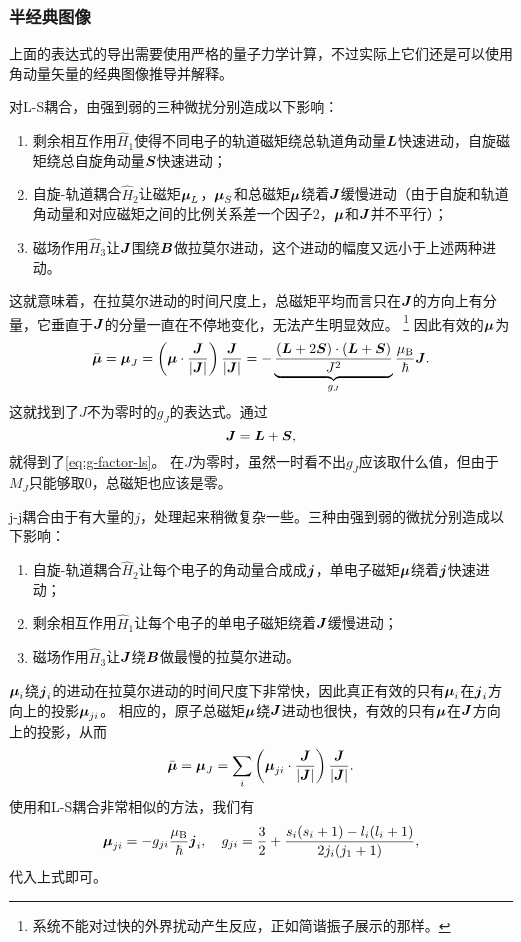 \subsubsection{半经典图像}

上面的表达式的导出需要使用严格的量子力学计算，不过实际上它们还是可以使用角动量矢量的经典图像推导并解释。

对L-S耦合，由强到弱的三种微扰分别造成以下影响：

\begin{enumerate}
    \item 剩余相互作用$\hat{H}_1$使得不同电子的轨道磁矩绕总轨道角动量$\vb*{L}$快速进动，自旋磁矩绕总自旋角动量$\vb*{S}$快速进动；
    \item 自旋-轨道耦合$\hat{H}_2$让磁矩$\vb*{\mu}_L$，$\vb*{\mu}_S$和总磁矩$\vb*{\mu}$绕着$\vb*{J}$缓慢进动（由于自旋和轨道角动量和对应磁矩之间的比例关系差一个因子2，$\vb*{\mu}$和$\vb*{J}$并不平行）；
    \item 磁场作用$\hat{H}_3$让$\vb*{J}$围绕$\vb*{B}$做拉莫尔进动，这个进动的幅度又远小于上述两种进动。
\end{enumerate}

这就意味着，在拉莫尔进动的时间尺度上，总磁矩平均而言只在$\vb*{J}$的方向上有分量，它垂直于$\vb*{J}$的分量一直在不停地变化，无法产生明显效应。%
\footnote{系统不能对过快的外界扰动产生反应，正如简谐振子展示的那样。}%
因此有效的$\vb*{\mu}$为
\[
    \bar{\vb*{\mu}} = \vb*{\mu}_J = \left(\vb*{\mu} \cdot \frac{\vb*{J}}{\abs{\vb*{J}}}\right) \frac{\vb*{J}}{\abs{\vb*{J}}} = - \underbrace{\frac{(\vb*{L} + 2\vb*{S}) \cdot (\vb*{L} + \vb*{S})}{J^2}}_{g_J} \frac{\mu_\text{B}}{\hbar} \vb*{J}.
\]
这就找到了$J$不为零时的$g_J$的表达式。通过
\[
    \vb*{J} = \vb*{L} + \vb*{S},
\]
就得到了\eqref{eq:g-factor-ls}。
在$J$为零时，虽然一时看不出$g_J$应该取什么值，但由于$M_J$只能够取$0$，总磁矩也应该是零。

j-j耦合由于有大量的$j$，处理起来稍微复杂一些。三种由强到弱的微扰分别造成以下影响：
\begin{enumerate}
    \item 自旋-轨道耦合$\hat{H}_2$让每个电子的角动量合成成$\vb*{j}$，单电子磁矩$\vb*{\mu}$绕着$\vb*{j}$快速进动；
    \item 剩余相互作用$\hat{H}_1$让每个电子的单电子磁矩绕着$\vb*{J}$缓慢进动；
    \item 磁场作用$\hat{H}_3$让$\vb*{J}$绕$\vb*{B}$做最慢的拉莫尔进动。
\end{enumerate}
$\vb*{\mu}_i$绕$\vb*{j}_i$的进动在拉莫尔进动的时间尺度下非常快，因此真正有效的只有$\vb*{\mu}_i$在$\vb*{j}_i$方向上的投影$\vb*{\mu}_{j i}$。
相应的，原子总磁矩$\vb*{\mu}$绕$\vb*{J}$进动也很快，有效的只有$\vb*{\mu}$在$\vb*{J}$方向上的投影，从而
\[
    \bar{\vb*{\mu}} = \vb*{\mu}_J = \sum_i \left( \vb*{\mu}_{j i} \cdot \frac{\vb*{J}}{\abs{\vb*{J}}} \right) \frac{\vb*{J}}{\abs{\vb*{J}}}.
\]
使用和L-S耦合非常相似的方法，我们有
\begin{equation}
    \vb*{\mu}_{j i} = - g_{j i} \frac{\mu_\text{B}}{\hbar} \vb*{j}_i, \quad g_{j i} = \frac{3}{2} + \frac{s_i(s_i + 1) - l_i (l_i + 1)}{2 j_i (j_1 + 1)},
\end{equation}
代入上式即可。

